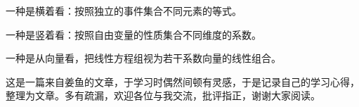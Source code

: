 \documentclass[fontset=none]{ctexart}
\begin{document}
一种是横着看：按照独立的事件集合不同元素的等式。

一种是竖着看：按照自由变量的性质集合不同维度的系数。

一种是从向量看，把线性方程组视为若干系数向量的线性组合。



这是一篇来自姜鱼的文章，于学习时偶然间顿有灵感，于是记录自己的学习心得，整理为文章。多有疏漏，欢迎各位与我交流，批评指正，谢谢大家阅读。
\end{document}
